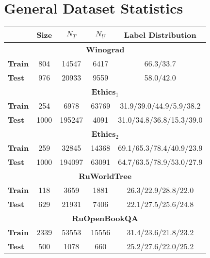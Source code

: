 \documentclass[11pt]{article}
\begin{document}
\clearpage
\newpage

\appendix
\setcounter{figure}{0}
\setcounter{table}{0}


\section{General Dataset Statistics}
\label{app:general_statistics}
\begin{table}[h!]
\centering
\small
\setlength{\tabcolsep}{3pt}
\begin{tabular}{lcccc}
\toprule
      & \bf Size & \bf $N_T$ & \bf $N_U$ & \bf Label Distribution               \\ \midrule
      \multicolumn{5}{c}{\textbf{Winograd}}                                     \\ \midrule
\bf Train & 804         & 14547   & 6417           & 66.3/33.7                \\
\bf Test  & 976         & 20933  & 9559          & 58.0/42.0                 \\ \midrule
      \multicolumn{5}{c}{\textbf{Ethics$_1$}}                                   \\ \midrule
\bf Train & 254          & 6978   & 63769         & 31.9/39.0/44.9/5.9/38.2  \\
\bf Test  & 1000        & 195247 & 4091          & 31.0/34.8/36.8/15.3/39.0 \\ \midrule
      \multicolumn{5}{c}{\textbf{Ethics$_2$}}                                   \\ \midrule
\bf Train & 259          & 32845 & 14368         & 69.1/65.3/78.4/40.9/23.9 \\
\bf Test  & 1000        & 194097 & 63091         & 64.7/63.5/78.9/53.0/27.9 \\ \midrule
      \multicolumn{5}{c}{\textbf{RuWorldTree}}                                    \\ \midrule
\bf Train & 118          & 3659   & 1881          & 26.3/22.9/28.8/22.0       \\
\bf Test  & 629         & 21931  & 7406          & 22.1/27.5/25.6/24.8       \\ \midrule
      \multicolumn{5}{c}{\textbf{RuOpenBookQA}}                                   \\ \midrule
\bf Train & 2339          & 53553  & 15556       & 31.4/23.6/21.8/23.2       \\
\bf Test  & 500         & 1078   & 660           & 25.2/27.6/22.0/25.2       \\ \midrule

\end{tabular}
\end{table}
\end{document}
